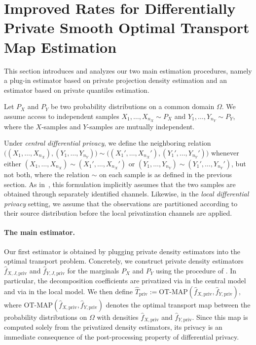 \documentclass{article}
\newcommand{\1}{\mathds{1}}
\theoremstyle{plain}
\theoremstyle{definition}
\theoremstyle{remark}
\begin{document}
\section{Improved Rates for Differentially Private Smooth Optimal Transport Map Estimation}
\label{sec:transport_map_estimation}

This section introduces and analyzes our two main estimation procedures, namely a plug-in estimator based on private projection density estimation and an estimator based on private quantiles estimation.

Let $P_X$ and $P_Y$ be two probability distributions on a common domain $\Omega$. We assume access to independent samples $X_1,\dots,X_{n_X} \sim P_X$ and $Y_1,\dots,Y_{n_Y} \sim P_Y$, where the $X$-samples and $Y$-samples are mutually independent.


Under \emph{central differential privacy}, we define the neighboring relation
$
\bigl((X_1,\dots,X_{n_X}),(Y_1,\dots,Y_{n_Y})\bigr)
\sim
\bigl((X_1',\dots,X_{n_X}'),(Y_1',\dots,Y_{n_Y}')\bigr)
$
whenever either $(X_1,\dots,X_{n_X}) \sim (X_1',\dots,X_{n_X}')$ or $(Y_1,\dots,Y_{n_Y}) \sim (Y_1',\dots,Y_{n_Y}')$, but not both, where the relation \(\sim\) on each sample is as defined in the previous section. As in~\cite{lalanne2025PrivateOTMaps}, this formulation implicitly assumes that the two samples are obtained through separately identified channels. Likewise, in the \emph{local differential privacy} setting, we assume that the observations are partitioned according to their source distribution before the local privatization channels are applied.


\paragraph{The main estimator.}
Our first estimator is obtained by plugging private density estimators into the optimal transport problem. Concretely, we construct private density estimators $\hat{f}_{X, J, \textrm{priv}}$ and $\hat{f}_{Y, J, \textrm{priv}}$ for the marginals $P_X$ and $P_Y$ using the procedure of . In particular, the decomposition coefficients are privatized via  in the central model and via  in the local model.
We then define
$
    \hat{T}_{\textrm{priv}} := \textrm{OT-MAP}(\hat{f}_{X, \textrm{priv}}, \hat{f}_{Y, \textrm{priv}}),
$
where $\textrm{OT-MAP}(\hat{f}_{X, \textrm{priv}}, \hat{f}_{Y, \textrm{priv}})$ denotes the optimal transport map between the probability distributions on $\Omega$ with densities $\hat{f}_{X, \textrm{priv}}$ and $\hat{f}_{Y, \textrm{priv}}$. Since this map is computed solely from the privatized density estimators, its privacy is an immediate consequence of the post-processing property of differential privacy.
\end{document}
